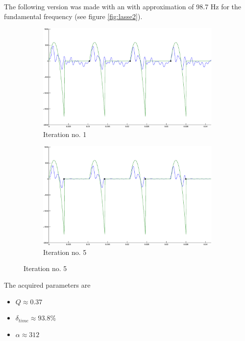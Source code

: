 \documentclass[12pt,a4]{article}
\begin{document}
The following version was made with an with approximation of 98.7 Hz for the fundamental frequency (see figure \ref{fig:lasse2}).
\begin{figure}[H]
 \centering
 \begin{subfigure}{.55\textwidth}
  \includegraphics[scale=.22]{img/Lasse-1.eps}
  \caption{Iteration no. 1}
 \end{subfigure}%
 \begin{subfigure}{.5\textwidth}
  \includegraphics[scale=.22]{img/Lasse-5.eps}
  \caption{Iteration no. 5}
 \end{subfigure}
 \end{figure}
 The acquired parameters are
 \begin{itemize}
  \item $Q \approx 0.37$  
  \item $\delta_{time} \approx 93.8\%$
  \item $\alpha \approx 312$ 
 \end{itemize}

\end{document}
